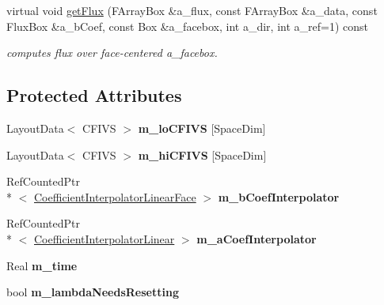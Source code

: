 \begin{DoxyCompactItemize}
\item 
\hypertarget{class_v_c_a_m_r_poisson_op_time_dep_a21a1566777e28a34111b22099d1bcbe3}{virtual void \hyperlink{class_v_c_a_m_r_poisson_op_time_dep_a21a1566777e28a34111b22099d1bcbe3}{get\-Flux} (F\-Array\-Box \&a\-\_\-flux, const F\-Array\-Box \&a\-\_\-data, const Flux\-Box \&a\-\_\-b\-Coef, const Box \&a\-\_\-facebox, int a\-\_\-dir, int a\-\_\-ref=1) const }\label{class_v_c_a_m_r_poisson_op_time_dep_a21a1566777e28a34111b22099d1bcbe3}

\begin{DoxyCompactList}\small\item\em computes flux over face-\/centered a\-\_\-facebox. \end{DoxyCompactList}\end{DoxyCompactItemize}
\subsection*{Protected Attributes}
\begin{DoxyCompactItemize}
\item 
\hypertarget{class_v_c_a_m_r_poisson_op_time_dep_a3bdc91ce4488c6f9c5cb54aa927e0e1f}{Layout\-Data$<$ C\-F\-I\-V\-S $>$ {\bfseries m\-\_\-lo\-C\-F\-I\-V\-S} \mbox{[}Space\-Dim\mbox{]}}\label{class_v_c_a_m_r_poisson_op_time_dep_a3bdc91ce4488c6f9c5cb54aa927e0e1f}

\item 
\hypertarget{class_v_c_a_m_r_poisson_op_time_dep_a66b09cfaff495a10d3c1b907ae5f220b}{Layout\-Data$<$ C\-F\-I\-V\-S $>$ {\bfseries m\-\_\-hi\-C\-F\-I\-V\-S} \mbox{[}Space\-Dim\mbox{]}}\label{class_v_c_a_m_r_poisson_op_time_dep_a66b09cfaff495a10d3c1b907ae5f220b}

\item 
\hypertarget{class_v_c_a_m_r_poisson_op_time_dep_a3029ece8612b0605243fd0c89271189c}{Ref\-Counted\-Ptr\\*
$<$ \hyperlink{class_coefficient_interpolator_linear_face}{Coefficient\-Interpolator\-Linear\-Face} $>$ {\bfseries m\-\_\-b\-Coef\-Interpolator}}\label{class_v_c_a_m_r_poisson_op_time_dep_a3029ece8612b0605243fd0c89271189c}

\item 
\hypertarget{class_v_c_a_m_r_poisson_op_time_dep_a394c6bcfadcd6808fbb06d325ca20039}{Ref\-Counted\-Ptr\\*
$<$ \hyperlink{class_coefficient_interpolator_linear}{Coefficient\-Interpolator\-Linear} $>$ {\bfseries m\-\_\-a\-Coef\-Interpolator}}\label{class_v_c_a_m_r_poisson_op_time_dep_a394c6bcfadcd6808fbb06d325ca20039}

\item 
\hypertarget{class_v_c_a_m_r_poisson_op_time_dep_a38d44ee07f05743058d30ce44f98a57b}{Real {\bfseries m\-\_\-time}}\label{class_v_c_a_m_r_poisson_op_time_dep_a38d44ee07f05743058d30ce44f98a57b}

\item 
\hypertarget{class_v_c_a_m_r_poisson_op_time_dep_a986427d7eda38ce6a4b06a3d2affd529}{bool {\bfseries m\-\_\-lambda\-Needs\-Resetting}}\label{class_v_c_a_m_r_poisson_op_time_dep_a986427d7eda38ce6a4b06a3d2affd529}

\end{DoxyCompactItemize}


